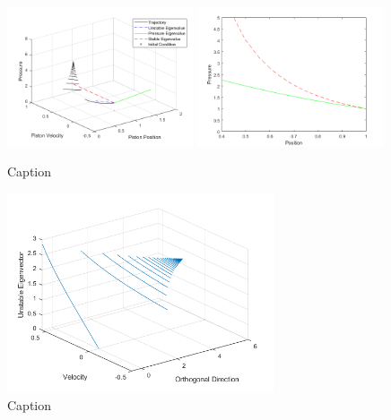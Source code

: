 \begin{figure}[!ht]
    \centering
    \includegraphics[width=0.49\textwidth]{Figures/Example/PhasePotrait3D.png}
    \includegraphics[width=0.49\textwidth]{Figures/Example/PressurePositionPhasePotrait2D.png}
    \caption{Caption}
    \label{fig:ExamplePhase}
\end{figure}

\begin{figure}[!ht]
    \centering
    \includegraphics[width=0.7\textwidth]{Figures/Example/EigenvectorPhasePotrait3D.png}
    \caption{Caption}
    \label{fig:EigPhase}
\end{figure}

